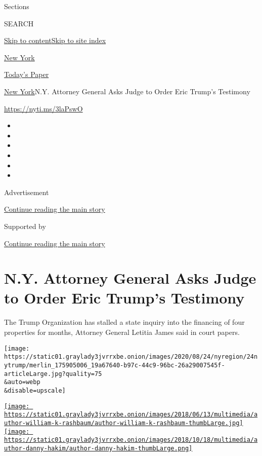 Sections

SEARCH

\protect\hyperlink{site-content}{Skip to
content}\protect\hyperlink{site-index}{Skip to site index}

\href{https://www.nytimes3xbfgragh.onion/section/nyregion}{New York}

\href{https://myaccount.nytimes3xbfgragh.onion/auth/login?response_type=cookie\&client_id=vi}{}

\href{https://www.nytimes3xbfgragh.onion/section/todayspaper}{Today's
Paper}

\href{/section/nyregion}{New York}\textbar{}N.Y. Attorney General Asks
Judge to Order Eric Trump's Testimony

\url{https://nyti.ms/3laPswO}

\begin{itemize}
\item
\item
\item
\item
\item
\item
\end{itemize}

Advertisement

\protect\hyperlink{after-top}{Continue reading the main story}

Supported by

\protect\hyperlink{after-sponsor}{Continue reading the main story}

\hypertarget{ny-attorney-general-asks-judge-to-order-eric-trumps-testimony}{%
\section{N.Y. Attorney General Asks Judge to Order Eric Trump's
Testimony}\label{ny-attorney-general-asks-judge-to-order-eric-trumps-testimony}}

The Trump Organization has stalled a state inquiry into the financing of
four properties for months, Attorney General Letitia James said in court
papers.

\texttt{[image: https://static01.graylady3jvrrxbe.onion/images/2020/08/24/nyregion/24nytrump/merlin\_175905006\_19a67640-b97c-44c9-96bc-26a29007545f-articleLarge.jpg?quality=75\\\&auto=webp\\\&disable=upscale]}

\href{https://www.nytimes3xbfgragh.onion/by/william-k-rashbaum}{\texttt{[image: https://static01.graylady3jvrrxbe.onion/images/2018/06/13/multimedia/author-william-k-rashbaum/author-william-k-rashbaum-thumbLarge.jpg]}}\href{https://www.nytimes3xbfgragh.onion/by/danny-hakim}{\texttt{[image: https://static01.graylady3jvrrxbe.onion/images/2018/10/18/multimedia/author-danny-hakim/author-danny-hakim-thumbLarge.png]}}

